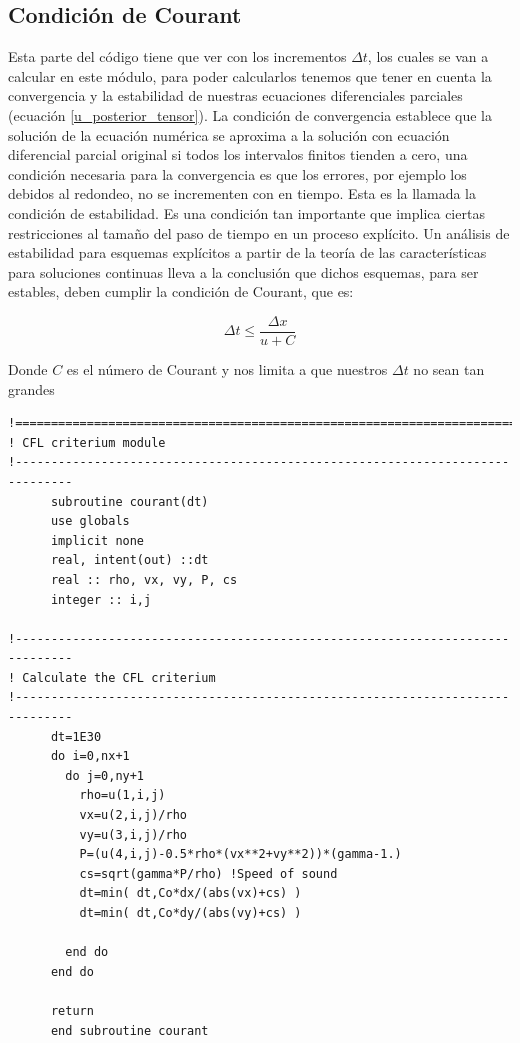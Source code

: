 \documentclass[12pt,a4paper]{book}
\begin{document}
\subsection{Condición de Courant}
Esta parte del código tiene que ver con los incrementos $\Delta t$, los cuales se van a calcular en este módulo, para poder calcularlos tenemos que tener en cuenta la convergencia y la estabilidad de nuestras ecuaciones diferenciales parciales (ecuación \ref{u_posterior_tensor}). La condición de convergencia establece que la solución de la ecuación numérica se aproxima a la solución con ecuación diferencial parcial original si todos los intervalos finitos tienden a cero, una condición necesaria para la convergencia es que los errores, por ejemplo los debidos al redondeo, no se incrementen con en tiempo. Esta es la llamada la condición de estabilidad. Es una condición tan importante que implica ciertas restricciones al tamaño del paso de tiempo en un proceso explícito. Un análisis de estabilidad para esquemas explícitos a partir de la teoría de las características para soluciones continuas lleva a la conclusión que dichos esquemas, para ser estables, deben cumplir la condición de Courant, que es: 

\begin{equation}
\Delta t \leq \frac{\Delta x}{u+C}
\end{equation}

Donde $C$ es el número de Courant y nos limita a que nuestros $\Delta t$ no sean tan grandes
\begin{lstlisting}[frame=single]
 !==============================================================================
! CFL criterium module
!------------------------------------------------------------------------------
      subroutine courant(dt)
      use globals
      implicit none
      real, intent(out) ::dt
      real :: rho, vx, vy, P, cs
      integer :: i,j

!------------------------------------------------------------------------------
! Calculate the CFL criterium
!------------------------------------------------------------------------------
      dt=1E30
      do i=0,nx+1
        do j=0,ny+1
          rho=u(1,i,j)
          vx=u(2,i,j)/rho
          vy=u(3,i,j)/rho
          P=(u(4,i,j)-0.5*rho*(vx**2+vy**2))*(gamma-1.)
          cs=sqrt(gamma*P/rho) !Speed of sound
          dt=min( dt,Co*dx/(abs(vx)+cs) )
          dt=min( dt,Co*dy/(abs(vy)+cs) )

        end do
      end do

      return
      end subroutine courant

\end{lstlisting}
\end{document}
